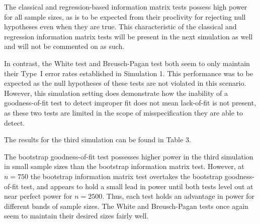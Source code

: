 \documentclass[review]{elsarticle}
\begin{document}
The classical and regression-based information matrix tests possess high power for all sample sizes, as is to be expected from their proclivity for rejecting null hypotheses even when they are true.
This characteristic of the classical and regression information matrix tests will be present in the next simulation as well and will not be commented on as such. 

In contrast, the White test and Breusch-Pagan test both seem to only maintain their Type~I error rates established in Simulation 1. This performance was to be expected
as the null hypotheses of these tests are not violated in this scenario. However, this simulation setting does demonstrate how the inability of a goodness-of-fit test to detect improper
fit does not mean lack-of-fit is not present, as these two tests are limited in the scope of misspecification they are able to detect.

The results for the third simulation can be found in Table 3.

\begin{table}[H]
	\centering
	\small\addtolength{\tabcolsep}{-3pt}
	\setlength\extrarowheight{-3pt}
	{
	}
	\end{table}

The bootstrap goodness-of-fit test possesses higher power in the third simulation in small sample sizes than the bootstrap information matrix test. However, at $n = 750$ the bootstrap information matrix test
overtakes the bootstrap goodness-of-fit test, and appears to hold a small lead in power until both tests level out at near perfect power for $n = 2500$. Thus, each test holds an advantage in power for different bands of sample sizes.
The White and Breusch-Pagan tests once again seem to maintain their desired sizes fairly well.
\end{document}
